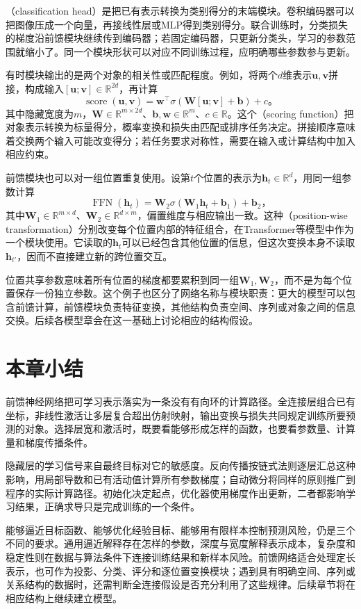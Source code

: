 （classification head）是把已有表示转换为类别得分的末端模块。卷积编码器可以把图像压成一个向量，再接线性层或MLP得到类别得分。联合训练时，分类损失的梯度沿前馈模块继续传到编码器；若固定编码器，只更新分类头，学习的参数范围就缩小了。同一个模块形状可以对应不同训练过程，应明确哪些参数参与更新。

有时模块输出的是两个对象的相关性或匹配程度。例如，将两个$d$维表示$\bm{u},\bm{v}$拼接，构成输入$[\bm{u};\bm{v}]\in\mathbb{R}^{2d}$，再计算
\begin{equation}
  \operatorname{score}(\bm{u},\bm{v})=
  \bm{w}^{\top}\sigma\!\left(\bm{W}[\bm{u};\bm{v}]+\bm{b}\right)+c\text{。}
  \label{eq:ffn-scoring-module}
\end{equation}
其中隐藏宽度为$m$，$\bm{W}\in\mathbb{R}^{m\times2d}$、$\bm{b},\bm{w}\in\mathbb{R}^{m}$、$c\in\mathbb{R}$。这个（scoring function）把对象表示转换为标量得分，概率变换和损失由匹配或排序任务决定。拼接顺序意味着交换两个输入可能改变得分；若任务要求对称性，需要在输入或计算结构中加入相应约束。

前馈模块也可以对一组位置重复使用。设第$t$个位置的表示为$\bm{h}_t\in\mathbb{R}^{d}$，用同一组参数计算
\begin{equation}
  \operatorname{FFN}(\bm{h}_t)=
  \bm{W}_2\sigma(\bm{W}_1\bm{h}_t+\bm{b}_1)+\bm{b}_2\text{，}
  \label{eq:ffn-positionwise-module}
\end{equation}
其中$\bm{W}_1\in\mathbb{R}^{m\times d}$、$\bm{W}_2\in\mathbb{R}^{d\times m}$，偏置维度与相应输出一致。这种（position-wise transformation）分别改变每个位置内部的特征组合，在Transformer等模型中作为一个模块使用。它读取的$\bm{h}_t$可以已经包含其他位置的信息，但这次变换本身不读取$\bm{h}_{t'}$，因而不直接建立新的跨位置交互。

位置共享参数意味着所有位置的梯度都要累积到同一组$\bm{W}_1,\bm{W}_2$，而不是为每个位置保存一份独立参数。这个例子也区分了网络名称与模块职责：更大的模型可以包含前馈计算，前馈模块负责特征变换，其他结构负责空间、序列或对象之间的信息交换。后续各模型章会在这一基础上讨论相应的结构假设。

\section{本章小结}
\label{sec:ffn-summary}

前馈神经网络把可学习表示落实为一条没有有向环的计算路径。全连接层组合已有坐标，非线性激活让多层复合超出仿射映射，输出变换与损失共同规定训练所要预测的对象。选择层宽和激活时，既要看能够形成怎样的函数，也要看参数量、计算量和梯度传播条件。

隐藏层的学习信号来自最终目标对它的敏感度。反向传播按链式法则逐层汇总这种影响，用局部导数和已有活动值计算所有参数梯度；自动微分将同样的原则推广到程序的实际计算路径。初始化决定起点，优化器使用梯度作出更新，二者都影响学习结果，正确求导只是完成训练的一个条件。

能够逼近目标函数、能够优化经验目标、能够用有限样本控制预测风险，仍是三个不同的要求。通用逼近解释存在怎样的参数，深度与宽度解释表示成本，复杂度和稳定性则在数据与算法条件下连接训练结果和新样本风险。前馈网络适合处理定长表示，也可作为投影、分类、评分和逐位置变换模块；遇到具有明确空间、序列或关系结构的数据时，还需判断全连接假设是否充分利用了这些规律。后续章节将在相应结构上继续建立模型。
